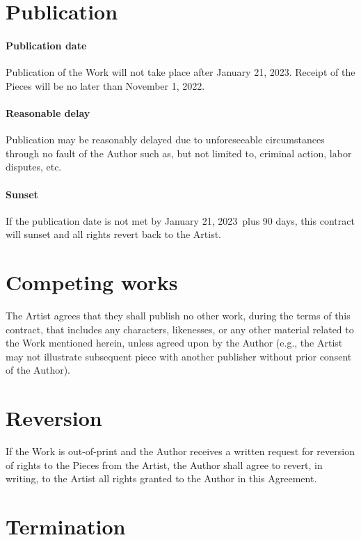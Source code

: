 \documentclass[12pt,letterpaper]{article}
\def\PublicationDate{January 21, 2023}
\begin{document}
\section{Publication}

\paragraph{Publication date}

Publication of the Work will not take place after \PublicationDate. Receipt of the Pieces will be no later than November 1, 2022.

\paragraph{Reasonable delay}

Publication may be reasonably delayed due to unforeseeable circumstances through no fault of the Author such as, but not limited to, criminal action, labor disputes, etc.

\paragraph{Sunset}

If the publication date is not met by \PublicationDate\ plus 90 days, this contract will sunset and all rights revert back to the Artist.

\section{Competing works}

The Artist agrees that they shall publish no other work, during the terms of this contract, that includes any characters, likenesses, or any other material related to the Work mentioned herein, unless agreed upon by the Author (e.g., the Artist may not illustrate subsequent piece with another publisher without prior consent of the Author).

\section{Reversion}

If the Work is out-of-print and the Author receives a written request for reversion of rights to the Pieces from the Artist, the Author shall agree to revert, in writing, to the Artist all rights granted to the Author in this Agreement.

\section{Termination}
\end{document}

